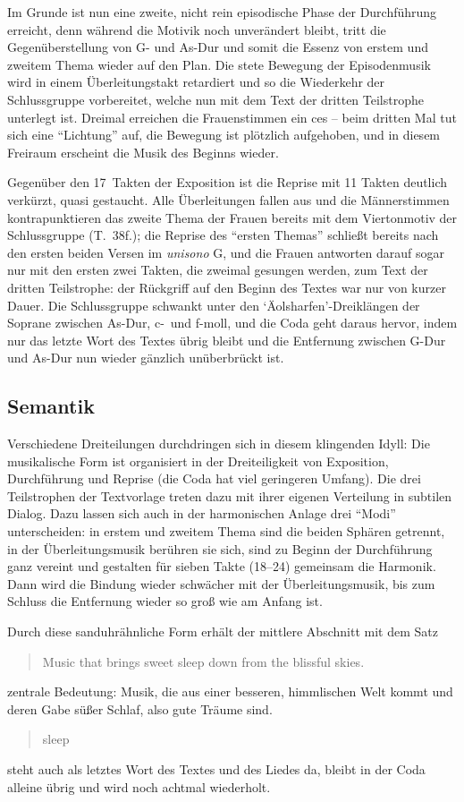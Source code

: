 \documentclass[a4paper,11pt,open=any]{scrbook}
\newcommand{\engquote}[1]{\foreignblockquote{english}{#1}}
\begin{document}
Im Grunde ist nun eine zweite, nicht rein episodische Phase der Durchführung
erreicht, denn während die Motivik noch unverändert bleibt, tritt die
Gegenüberstellung von G- und As-Dur und somit die Essenz von erstem und
zweitem Thema wieder auf den Plan.  Die stete Bewegung der Episodenmusik
wird in einem Überleitungstakt retardiert und so die Wiederkehr der
Schlussgruppe vorbereitet, welche nun mit dem Text der dritten Teilstrophe
unterlegt ist.  Dreimal erreichen die Frauenstimmen ein \textsf{ces} – beim
dritten Mal tut sich eine \enquote{Lichtung} auf, die Bewegung ist plötzlich
aufgehoben, und in diesem Freiraum erscheint die Musik des Beginns wieder.

Gegenüber den 17~Takten der Exposition ist die Reprise mit 11 Takten deutlich
verkürzt, quasi gestaucht.  Alle Überleitungen fallen aus und die Männerstimmen
kontrapunktieren das zweite Thema der Frauen bereits mit dem Viertonmotiv der
Schlussgruppe (T.~38f.); die Reprise des \enquote{ersten Themas} schließt
bereits nach den ersten beiden Versen im \textit{unisono} \textsf{G}, und
die Frauen antworten darauf sogar nur mit den ersten zwei Takten, die zweimal
gesungen werden, zum Text der dritten Teilstrophe: der Rückgriff auf den
Beginn des Textes war nur von kurzer Dauer.  Die Schlussgruppe schwankt
unter den \enquote*{Äolsharfen}-Dreiklängen der Soprane zwischen As-Dur,
c-~und f-moll, und die Coda geht daraus hervor, indem nur das letzte Wort
des Textes übrig bleibt und die Entfernung zwischen G-Dur und As-Dur nun
wieder gänzlich unüberbrückt ist.

\subsection*{Semantik}
Verschiedene Dreiteilungen durchdringen sich in diesem klingenden Idyll:
Die musikalische Form ist organisiert in der Dreiteiligkeit von Exposition,
Durchführung und Reprise (die Coda hat viel geringeren Umfang).  Die
drei Teilstrophen der Textvorlage treten dazu mit ihrer eigenen Verteilung
in subtilen Dialog.  Dazu lassen sich auch in der harmonischen Anlage drei
\enquote{Modi} unterscheiden: in erstem und zweitem Thema sind die beiden
Sphären getrennt, in der Überleitungsmusik berühren sie sich, sind zu Beginn
der Durchführung ganz vereint und gestalten für sieben Takte (18–24) gemeinsam
die Harmonik.  Dann wird die Bindung wieder schwächer mit der Überleitungsmusik,
bis zum Schluss die Entfernung wieder so groß wie am Anfang ist.

Durch diese sanduhrähnliche Form erhält der mittlere Abschnitt mit dem
Satz \engquote{Music that brings sweet sleep down from the blissful skies.}
zentrale Bedeutung: Musik, die aus einer besseren, himmlischen Welt kommt
und deren Gabe süßer Schlaf, also gute Träume sind.  \engquote{sleep} steht
auch als letztes Wort des Textes und des Liedes da, bleibt in der Coda
alleine übrig und wird noch achtmal wiederholt.
\end{document}

